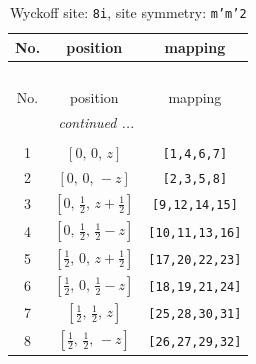 \documentclass[fleqn,8pt]{jsarticle}
\begin{document}
\begin{longtable}{ccc}
\caption{Wyckoff site: {\tt 8i}, site symmetry: {\tt m'm'2}}
 \\
 \hline \hline
No. & position & mapping \\ \hline \endfirsthead

\multicolumn{2}{l}{\tablename\ \thetable{}} \\
 \hline \hline
No. & position & mapping \\ \hline \endhead

 \hline \hline
\multicolumn{2}{r}{\footnotesize\it continued ...} \\ \endfoot

 \hline \hline
\multicolumn{2}{r}{} \\ \endlastfoot

1 & $\left[ 0,\, 0,\, z \right]$ & {\tt [1,4,6,7]} \\ \hline
2 & $\left[ 0,\, 0,\, - z \right]$ & {\tt [2,3,5,8]} \\ \hline
3 & $\left[ 0,\, \frac{1}{2},\, z + \frac{1}{2} \right]$ & {\tt [9,12,14,15]} \\ \hline
4 & $\left[ 0,\, \frac{1}{2},\, \frac{1}{2} - z \right]$ & {\tt [10,11,13,16]} \\ \hline
5 & $\left[ \frac{1}{2},\, 0,\, z + \frac{1}{2} \right]$ & {\tt [17,20,22,23]} \\ \hline
6 & $\left[ \frac{1}{2},\, 0,\, \frac{1}{2} - z \right]$ & {\tt [18,19,21,24]} \\ \hline
7 & $\left[ \frac{1}{2},\, \frac{1}{2},\, z \right]$ & {\tt [25,28,30,31]} \\ \hline
8 & $\left[ \frac{1}{2},\, \frac{1}{2},\, - z \right]$ & {\tt [26,27,29,32]} \\
\end{longtable}
\renewcommand{\arraystretch}{1.2}
\end{document}
